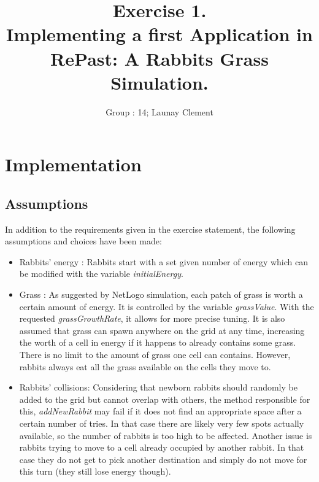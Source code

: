 \documentclass[11pt]{article}
\title{\bf Exercise 1.\\ Implementing a first Application in RePast: A Rabbits Grass Simulation.}
\author{Group \textnumero: 14; Launay Clement}
\begin{document}
\maketitle

\section{Implementation}
\subsection{Assumptions}

In addition to the requirements given in the exercise statement, the following assumptions and choices have been made:

\begin{itemize}

\item Rabbits' energy : Rabbits start with a set given number of energy which can be modified with the variable \textit{initialEnergy}.
 
\item Grass : As suggested by NetLogo simulation, each patch of grass is worth a certain amount of energy. It is controlled by the variable \textit{grassValue}. With the requested \textit{grassGrowthRate}, it allows for more precise tuning. It is also assumed that grass can spawn anywhere on the grid at any time, increasing the worth of a cell in energy if it happens to already contains some grass. There is no limit to the amount of grass one cell can contains. However, rabbits always eat all the grass available on the cells they move to.
 
\item Rabbits' collisions: Considering that newborn rabbits should randomly be added to the grid but cannot overlap with others, the method responsible for this, \textit{addNewRabbit} may fail if it does not find an appropriate space after a certain number of tries. In that case there are likely very few spots actually available, so the number of rabbits is too high to be affected. Another issue is rabbits trying to move to a cell already occupied by another rabbit. In that case they do not get to pick another destination and simply do not move for this turn (they still lose energy though).

\end{itemize}
\end{document}

